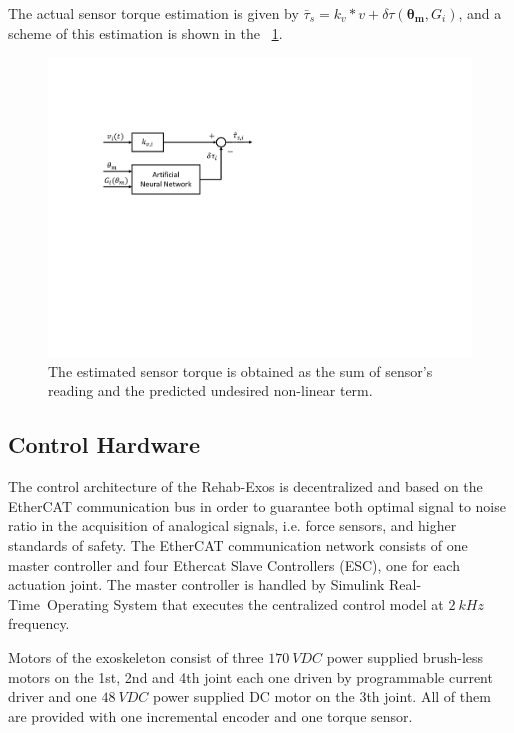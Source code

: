 \documentclass[journal]{IEEEtran}
\newcommand{\hl}[1]{\colorbox{yellow}{#1}}
\newcommand{\vect}[1]{\mathbf{#1}}
\newcommand{\hldone}[1]{\colorbox{green}{#1}}
\begin{document}
The actual sensor torque estimation is given by $\bar{\tau}_s = k_v * v + \delta\tau(\vect{\theta_m},G_i)$, and a scheme of this estimation is shown in the \figurename \ \ref{fig:NN_schema}.
\begin{figure}[]
	\centering
	\includegraphics[width=0.7\columnwidth]{torqueEstimation}	
	\caption{The estimated sensor torque is obtained as the sum of sensor's reading and the predicted undesired non-linear term.}
	\label{fig:NN_schema}
\end{figure}
\subsection{Control Hardware}
The control architecture of the Rehab-Exos is decentralized and based on the EtherCAT communication bus in order to guarantee both optimal signal to noise ratio in the acquisition of analogical signals, i.e. force sensors, and higher standards of safety.
The EtherCAT communication network consists of one master controller and four Ethercat Slave Controllers (ESC), one for each actuation joint.
The master controller is handled by Simulink Real-Time\texttrademark \ Operating System that executes the centralized control model at $2 \ kHz$ frequency.

Motors of the exoskeleton consist of three $170 \ VDC$ power supplied brush-less motors on the 1st, 2nd and 4th joint each one driven by programmable current driver and one $48 \ VDC$ power supplied DC motor on the 3th joint.  All of them are provided with one incremental encoder and one torque sensor.
\end{document}
